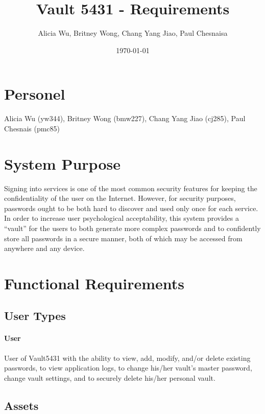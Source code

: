 \documentclass{article}
\title{Vault 5431 - Requirements}
\author{Alicia Wu, Britney Wong, Chang Yang Jiao, Paul Chesnaisa}
\date{\today}
\begin{document}
\maketitle
\thispagestyle{empty}

\section{Personel}
\label{sec:personel}
Alicia Wu (yw344), Britney Wong (bmw227), Chang Yang Jiao (cj285), Paul Chesnais (pmc85)


\section{System Purpose}
\label{sec:system_purpose}

Signing into services is one of the most common security features for keeping the confidentiality of the user on the Internet. However, for security purposes, passwords ought to be both hard to discover and used only once for each service. In order to increase user psychological acceptability, this system provides a ``vault'' for the users to both generate more complex passwords and to confidently store all passwords in a secure manner, both of which may be accessed from anywhere and any device.

\section{Functional Requirements}
\label{sec:functional_requirements}

\subsection{User Types}
\label{sub:user_types}

\paragraph{User}
\label{par:user}
User of Vault5431 with the ability to view, add, modify, and/or delete existing passwords, to view application logs, to change his/her vault's master password, change vault settings, and to securely delete his/her personal vault.

\subsection{Assets}
\label{sub:assets}
\end{document}
